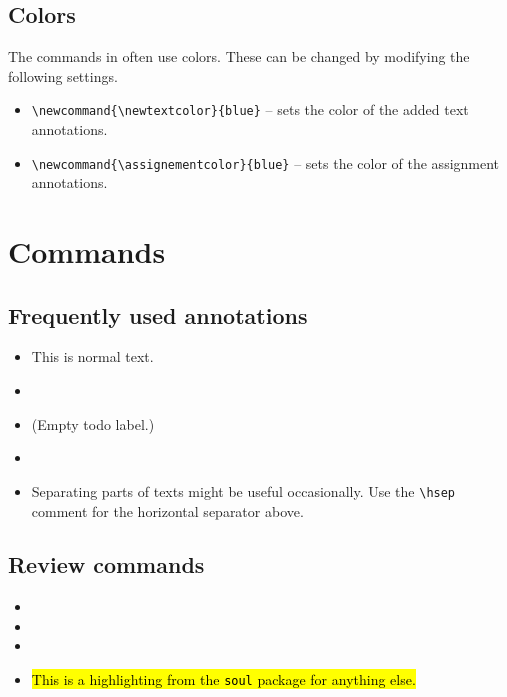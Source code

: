 \documentclass{article}
\begin{document}
\subsection{Colors}

The commands in  often use colors. These can be changed by modifying the following settings.
\begin{itemize}
    \item \verb|\newcommand{\newtextcolor}{blue}| -- sets the color of the added text annotations.
    \item \verb|\newcommand{\assignementcolor}{blue}| -- sets the color of the assignment annotations.
\end{itemize}





\section{Commands}\label{sec:commands}

\subsection{Frequently used annotations}

\begin{itemize}
    \item This is normal text.
    \item {}
    \item \TODO{} (Empty todo label.)
    \item {}
\end{itemize}

\hsep

\begin{itemize}
    \item Separating parts of texts might be useful occasionally. Use the \texttt{\textbackslash hsep} comment for the horizontal separator above.
\end{itemize}

\subsection{Review commands}

\begin{itemize}
    \item {}
    \item {}
    \item {}
    \item \hl{This is a highlighting from the \texttt{soul} package for anything else.}
\end{itemize}
\end{document}

